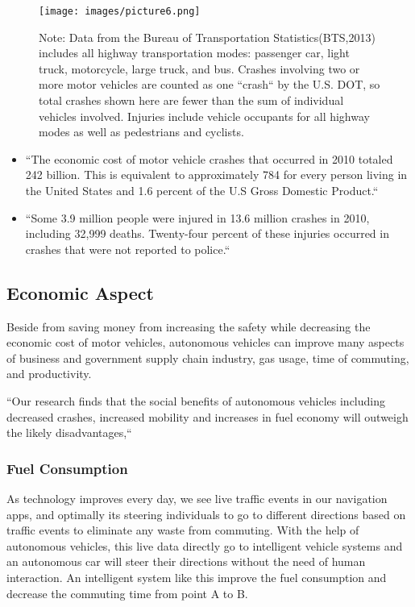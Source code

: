 \documentclass[sigconf]{acmart}
\begin{document}
 \begin{figure}[!ht]
  \centering
      \texttt{[image: images/picture6.png]}
  \caption{Note: Data from the Bureau of Transportation Statistics(BTS,2013) includes all highway transportation modes: passenger car, light truck, motorcycle, large truck, and bus. Crashes involving two or more motor vehicles are counted as one ``crash`` by the U.S. DOT, so total crashes shown  here are fewer than the sum of individual vehicles involved. Injuries include vehicle occupants for all highway modes as well as pedestrians and cyclists.}\label{fig:NHTSAaccidentreport2}
\end{figure}

\begin{itemize}

\item ``The economic cost of motor vehicle crashes that occurred in 2010 totaled 242 billion. This is equivalent to approximately 784 for every person living in the United States and 1.6 percent of the U.S Gross Domestic Product.``\cite{lawrance}

\item ``Some 3.9 million people were injured in 13.6 million crashes in 2010, including 32,999 deaths. Twenty-four percent of these injuries occurred in crashes that were not reported to police.``\cite{lawrance}

\end{itemize}


\subsection{Economic Aspect}
Beside from saving money from increasing the safety while decreasing the economic cost of motor vehicles, autonomous vehicles can improve many aspects of business and government supply chain industry, gas usage, time of commuting, and productivity.

``Our research finds that the social benefits of autonomous vehicles including decreased crashes, increased mobility and increases in fuel economy will outweigh the likely disadvantages,``\cite{RAND}

\subsubsection{Fuel Consumption}As technology improves every day, we see live traffic events in our navigation apps, and optimally its steering individuals to go to different directions based on traffic events to eliminate any waste from commuting. With the help of autonomous vehicles, this live data directly go to intelligent vehicle systems and an autonomous car will steer their directions without the need of human interaction. An intelligent system like this improve the fuel consumption and decrease the commuting time from point A to B.
\end{document}

